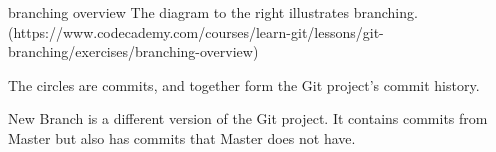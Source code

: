branching overview
    The diagram to the right illustrates branching.(https://www.codecademy.com/courses/learn-git/lessons/git-branching/exercises/branching-overview)
    
        The circles are commits, and together form the Git project’s commit history.
    
        New Branch is a different version of the Git project. It contains commits from Master but also has commits that Master does not have.
